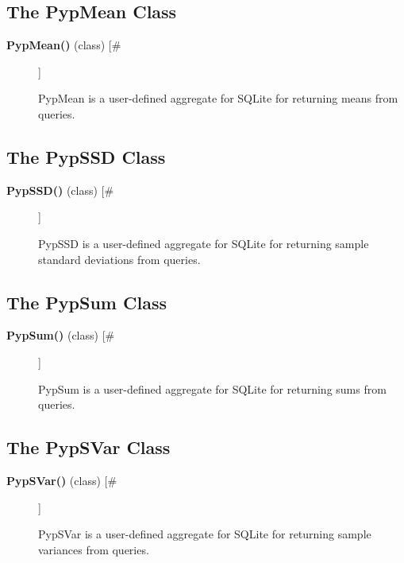 \documentclass[10pt]{article}
\begin{document}
\subsection*{The PypMean Class}
\begin{description}
\item[\textbf{PypMean()}
 (class) [\#]]

 PypMean is a user-defined aggregate for SQLite for returning means from queries.


\end{description}
\subsection*{The PypSSD Class}
\begin{description}
\item[\textbf{PypSSD()}
 (class) [\#]]

 PypSSD is a user-defined aggregate for SQLite for returning sample standard deviations from queries.


\end{description}
\subsection*{The PypSum Class}
\begin{description}
\item[\textbf{PypSum()}
 (class) [\#]]

 PypSum is a user-defined aggregate for SQLite for returning sums from queries.


\end{description}
\subsection*{The PypSVar Class}
\begin{description}
\item[\textbf{PypSVar()}
 (class) [\#]]

 PypSVar is a user-defined aggregate for SQLite for returning sample variances from queries.


\end{description}
\end{document}
